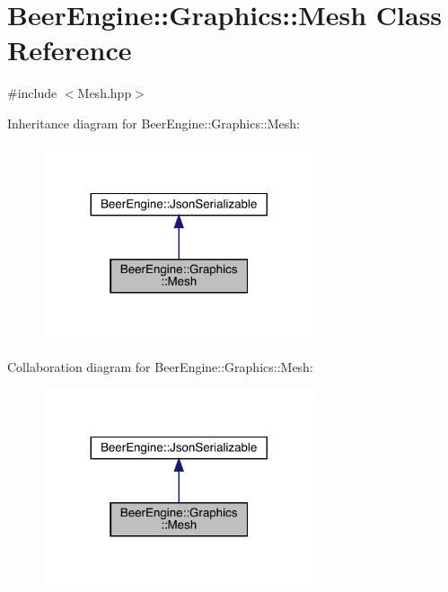 \hypertarget{class_beer_engine_1_1_graphics_1_1_mesh}{}\section{Beer\+Engine\+:\+:Graphics\+:\+:Mesh Class Reference}
\label{class_beer_engine_1_1_graphics_1_1_mesh}


{\ttfamily \#include $<$Mesh.\+hpp$>$}



Inheritance diagram for Beer\+Engine\+:\+:Graphics\+:\+:Mesh\+:
\nopagebreak
\begin{figure}[H]
\begin{center}
\leavevmode
\includegraphics[width=227pt]{class_beer_engine_1_1_graphics_1_1_mesh__inherit__graph}
\end{center}
\end{figure}


Collaboration diagram for Beer\+Engine\+:\+:Graphics\+:\+:Mesh\+:
\nopagebreak
\begin{figure}[H]
\begin{center}
\leavevmode
\includegraphics[width=227pt]{class_beer_engine_1_1_graphics_1_1_mesh__coll__graph}
\end{center}
\end{figure}
